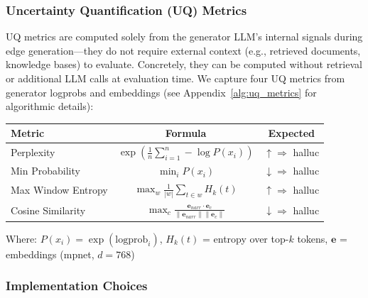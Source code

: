 \subsubsection{Uncertainty Quantification (UQ) Metrics}
\label{sec:uq_metrics_definition}
UQ metrics are computed solely from the generator LLM's internal signals during edge generation---they do not require external context (e.g., retrieved documents, knowledge bases) to evaluate. Concretely, they can be computed without retrieval or additional LLM calls at evaluation time. We capture four UQ metrics from generator logprobs and embeddings (see Appendix~\ref{alg:uq_metrics} for algorithmic details):

\begin{table}[H]
\centering
\footnotesize
\begin{tabular}{@{}lcc@{}}
\toprule
\textbf{Metric} & \textbf{Formula} & \textbf{Expected} \\
\midrule
Perplexity & $\displaystyle\exp\left(\frac{1}{n}\sum_{i=1}^{n} -\log P(x_i)\right)$ & $\uparrow \Rightarrow$ halluc \\[1.5ex]
Min Probability & $\displaystyle\min_i P(x_i)$ & $\downarrow \Rightarrow$ halluc \\[1.5ex]
Max Window Entropy & $\displaystyle\max_w \frac{1}{|w|} \sum_{t \in w} H_k(t)$ & $\uparrow \Rightarrow$ halluc \\[1.5ex]
Cosine Similarity & $\displaystyle\max_c \frac{\mathbf{e}_{narr} \cdot \mathbf{e}_c}{\|\mathbf{e}_{narr}\| \|\mathbf{e}_c\|}$ & $\downarrow \Rightarrow$ halluc \\
\bottomrule
\end{tabular}
\end{table}

Where: $P(x_i) = \exp(\text{logprob}_i)$, $H_k(t)$ = entropy over top-$k$ tokens, $\mathbf{e}$ = embeddings (mpnet, $d=768$)

\subsubsection{Implementation Choices}

